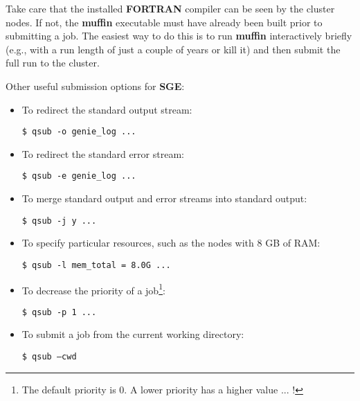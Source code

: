 \documentclass[11pt,fleqn]{book} %
\begin{document}
Take care that the installed \textbf{FORTRAN} compiler can be seen by the cluster nodes. If not, the \textbf{muffin} executable must have already been built prior to submitting a job. The easiest way to do this is to run \textbf{muffin} interactively briefly (e.g., with a run length of just a couple of years or kill it) and then submit the full run to the cluster.

Other useful submission options for \textbf{SGE}:

\begin{itemize}[noitemsep]
\setlength{\itemindent}{.2in}

        \item To redirect the standard output stream:
        \vspace{-2pt}\begin{verbatim}$ qsub -o genie_log ...\end{verbatim}

        \item To redirect the standard error stream:
        \vspace{-2pt}\begin{verbatim}$ qsub -e genie_log ...\end{verbatim}

        \item To merge standard output and error streams into standard output:
        \vspace{-2pt}\begin{verbatim}$ qsub -j y ...\end{verbatim}

        \item To specify particular resources, such as the nodes with 8 GB of RAM:
        \vspace{-2pt}\begin{verbatim}$ qsub -l mem_total = 8.0G ...\end{verbatim}

        \item To decrease the priority of a job\footnote{The default priority is 0. A lower priority has a higher value ... !}:
        \vspace{-2pt}\begin{verbatim}$ qsub -p 1 ...\end{verbatim}

        \item To submit a job from the current working directory:
        \vspace{-2pt}\begin{verbatim}$ qsub –cwd\end{verbatim}


\end{itemize}
\end{document}
